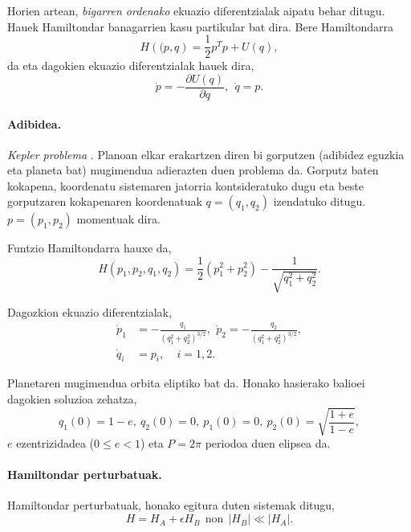 Horien artean, \emph{bigarren ordenako} ekuazio diferentzialak aipatu behar ditugu. Hauek Hamiltondar banagarrien kasu partikular bat dira. Bere Hamiltondarra  
\begin{equation*}
H(\mathbf(p,q)=\frac{1}{2}p^Tp +U(q),
\end{equation*}
da eta dagokien ekuazio diferentzialak hauek dira,
\begin{equation}
\label{eq:biorden}
\dot{p}=-\frac{\partial U(q)}{\partial q}, \ \ \dot{q}=p. 
\end{equation}

\paragraph*{Adibidea.}
\emph{Kepler problema} \cite{Hairer2006}. Planoan elkar erakartzen diren bi gorputzen (adibidez eguzkia eta planeta bat) mugimendua adierazten duen problema da. Gorputz baten kokapena, koordenatu sistemaren jatorria kontsideratuko dugu eta beste gorputzaren kokapenaren koordenatuak $q=(q_1,q_2)$ izendatuko ditugu. $p=(p_1,p_2)$ momentuak dira. 

Funtzio Hamiltondarra hauxe da,
\begin{equation*}
H(p_1,p_2,q_1,q_2)=\frac{1}{2}(p_1^2+p_2^2)-\frac{1}{\sqrt{q_1^2+q_2^2}}.
\end{equation*}

Dagozkion ekuazio diferentzialak,
\begin{align*}
\dot{p}_1 &= -\frac{q_1}{(q_1^2+q_2^2)^{3/2}}, \ \, \dot{p}_2= -\frac{q_2}{(q_1^2+q_2^2)^{3/2}}, \\
\dot{q}_i &=p_i, \ \ \ \ \ i=1,2.
\end{align*}

Planetaren mugimendua orbita eliptiko bat da. Honako hasierako balioei dagokien soluzioa zehatza,
\begin{equation*}
q_1(0)=1-e, \ q_2(0)=0, \ p_1(0)=0, \ p_2(0)=\sqrt{ \frac{1+e}{1-e}}, 
\end{equation*}
$e$ ezentrizidadea ($0\le e < 1$)  eta $P=2\pi$ periodoa duen elipsea da. 

\paragraph*{Hamiltondar perturbatuak.} Hamiltondar perturbatuak, honako egitura duten sistemak ditugu,
\begin{equation*}
H=H_A+\epsilon H_B \ \  \text{non} \ \ |H_B|\ll |H_A|.
\end{equation*}

